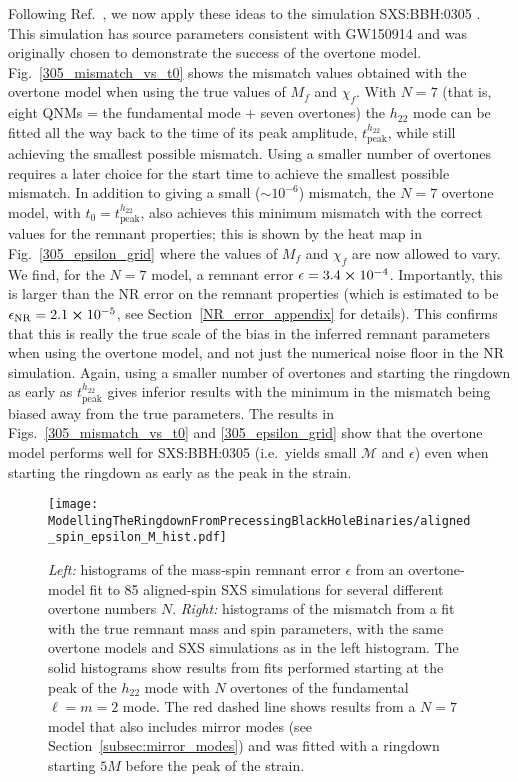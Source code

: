 Following Ref.~\cite{Giesler:2019uxc}, we now apply these ideas to the simulation SXS:BBH:0305 \cite{Lovelace:2016uwp}.
This simulation has source parameters consistent with GW150914 and was originally chosen to demonstrate the success of the overtone model. 
Fig.~\ref{305_mismatch_vs_t0} shows the mismatch values obtained with the overtone model when using the true values of $M_f$ and $\chi_f$.
With $N=7$ (that is, eight QNMs = the fundamental mode + seven overtones) the $h_{22}$ mode can be fitted all the way back to the time of its peak amplitude, $t_{\mathrm{peak}}^{h_{22}}$, while still achieving the smallest possible mismatch.
Using a smaller number of overtones requires a later choice for the start time to achieve the smallest possible mismatch.
In addition to giving a small ($\sim 10^{-6}$) mismatch, the $N=7$ overtone model, with $t_0 = t_{\mathrm{peak}}^{h_{22}}$, also achieves this minimum mismatch with the correct values for the remnant properties; this is shown by the heat map in Fig.~\ref{305_epsilon_grid} where the values of $M_f$ and $\chi_f$ are now allowed to vary. 
We find, for the $N=7$ model, a remnant error $\epsilon = 3.4 \cross 10^{-4}$. 
Importantly, this is larger than the NR error on the remnant properties (which is estimated to be $\epsilon_{\mathrm{NR}} = 2.1 \cross 10^{-5}$, see Section~\ref{NR_error_appendix} for details). This confirms that this is really the true scale of the bias in the inferred remnant parameters when using the overtone model, and not just the numerical noise floor in the NR simulation.
Again, using a smaller number of overtones and starting the ringdown as early as $t_{\mathrm{peak}}^{h_{22}}$ gives inferior results with the minimum in the mismatch being biased away from the true parameters.
The results in Figs.~\ref{305_mismatch_vs_t0} and \ref{305_epsilon_grid} show that the overtone model performs well for SXS:BBH:0305 (i.e.\ yields small $\mathcal{M}$ and $\epsilon$) even when starting the ringdown as early as the peak in the strain.

\begin{figure}[t]
    \centering
    \texttt{[image: ModellingTheRingdownFromPrecessingBlackHoleBinaries/aligned\_spin\_epsilon\_M\_hist.pdf]}
    \caption[Remnant error and mismatches for fits to aligned-spin SXS simulations using an overtone model]{\emph{Left:} histograms of the mass-spin remnant error $\epsilon$ from an overtone-model fit to 85 aligned-spin SXS simulations for several different overtone numbers $N$. 
    \emph{Right:} histograms of the mismatch from a fit with the true remnant mass and spin parameters, with the same overtone models and SXS simulations as in the left histogram.
    The solid histograms show results from fits performed starting at the peak of the $h_{22}$ mode with $N$ overtones of the fundamental $\ell = m = 2$ mode.
    The red dashed line shows results from a $N=7$ model that also includes mirror modes (see Section~\ref{subsec:mirror_modes}) and was fitted with a ringdown starting $5M$ before the peak of the strain.}
    \label{aligned_spin_epsilon_hist}
\end{figure}


